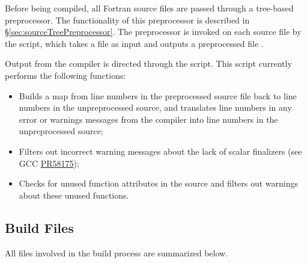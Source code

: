 Before being compiled, all Fortran source files are passed through a tree-based preprocessor. The functionality of this preprocessor is described in \S\ref{sec:sourceTreePreprocessor}. The preprocessor is invoked on each source file by the  script, which takes a  file as input and outputs a preprocessed file .

Output from the  compiler is directed through the  script. This script currently performs the following functions:
\begin{itemize}
\item Builds a map from line numbers in the preprocessed source file back to line numbers in the unpreprocessed source, and translates line numbers in any error or warnings messages from the compiler into line numbers in the unpreprocessed source;
\item Filters out incorrect warning messages about the lack of scalar finalizers (see GCC \href{https://gcc.gnu.org/bugzilla/show_bug.cgi?id=58175}{PR58175});
\item Checks for unused function attributes in the source and filters out warnings about these unused functions.
\end{itemize}

\subsection{Build Files}

All files involved in the build process are summarized below.

